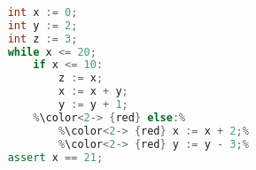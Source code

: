 \begin{lstlisting}[language=C++, style=withAssert]  % Start your code-block
	
	int x := 0;
	int y := 2;
	int z := 3;
	while x <= 20;
		if x <= 10:
			z := x;
			x := x + y;
			y := y + 1;
		%\color<2-> {red} else:%
			%\color<2-> {red} x := x + 2;%
			%\color<2-> {red} y := y - 3;%
	assert x == 21;
	\end{lstlisting}